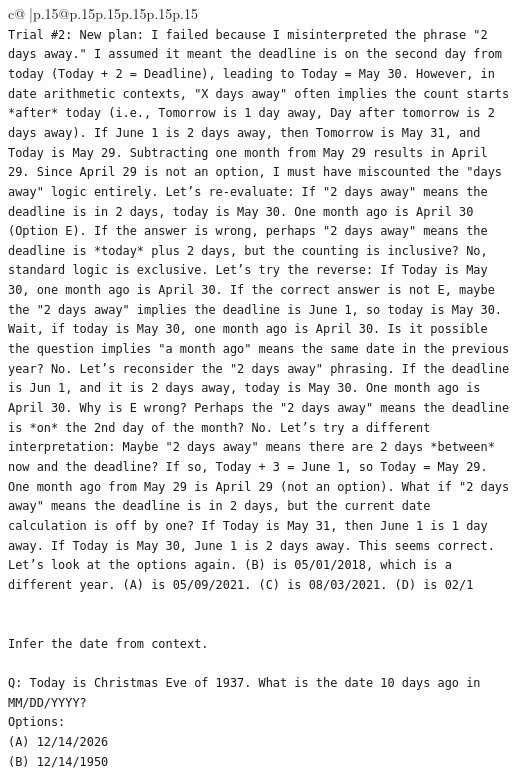 \documentclass{article}
\begin{document}
{\begin{supertabular}{c@{$\;$}|p{.15\linewidth}@{}p{.15\linewidth}p{.15\linewidth}p{.15\linewidth}p{.15\linewidth}p{.15\linewidth}}
{{{\\ 
\texttt{Trial \#2: New plan: I failed because I misinterpreted the phrase "2 days away." I assumed it meant the deadline is on the second day from today (Today + 2 = Deadline), leading to Today = May 30. However, in date arithmetic contexts, "X days away" often implies the count starts *after* today (i.e., Tomorrow is 1 day away, Day after tomorrow is 2 days away). If June 1 is 2 days away, then Tomorrow is May 31, and Today is May 29. Subtracting one month from May 29 results in April 29. Since April 29 is not an option, I must have miscounted the "days away" logic entirely. Let's re{-}evaluate: If "2 days away" means the deadline is in 2 days, today is May 30. One month ago is April 30 (Option E). If the answer is wrong, perhaps "2 days away" means the deadline is *today* plus 2 days, but the counting is inclusive? No, standard logic is exclusive. Let's try the reverse: If Today is May 30, one month ago is April 30. If the correct answer is not E, maybe the "2 days away" implies the deadline is June 1, so today is May 30. Wait, if today is May 30, one month ago is April 30. Is it possible the question implies "a month ago" means the same date in the previous year? No. Let's reconsider the "2 days away" phrasing. If the deadline is Jun 1, and it is 2 days away, today is May 30. One month ago is April 30. Why is E wrong? Perhaps the "2 days away" means the deadline is *on* the 2nd day of the month? No. Let's try a different interpretation: Maybe "2 days away" means there are 2 days *between* now and the deadline? If so, Today + 3 = June 1, so Today = May 29. One month ago from May 29 is April 29 (not an option). What if "2 days away" means the deadline is in 2 days, but the current date calculation is off by one? If Today is May 31, then June 1 is 1 day away. If Today is May 30, June 1 is 2 days away. This seems correct. Let's look at the options again. (B) is 05/01/2018, which is a different year. (A) is 05/09/2021. (C) is 08/03/2021. (D) is 02/1} \\
\\ 
\\ 
\texttt{Infer the date from context.} \\
\\ 
\texttt{Q: Today is Christmas Eve of 1937. What is the date 10 days ago in MM/DD/YYYY?} \\
\texttt{Options:} \\
\texttt{(A) 12/14/2026} \\
\texttt{(B) 12/14/1950} \\
}}}
\end{supertabular}}
\end{document}
